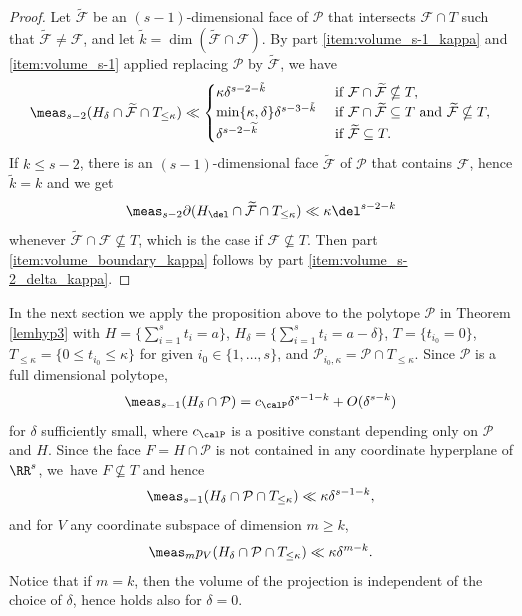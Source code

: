 \begin{proof}
Let $\widetilde{\mathcal F}$ be an $(s-1)$-dimensional face of $\mathcal P$ that intersects $\mathcal F\cap T$
such that $\widetilde{\mathcal F}\neq\mathcal F$, and let
$\tilde k=\dim(\widetilde{\mathcal F}\cap\mathcal F)$. By part \eqref{item:volume_s-1_kappa} and \eqref{item:volume_s-1} applied replacing
$\mathcal P$ by $\widetilde{\mathcal F}$, we have
\[
\meas_{s-2}(H_\delta\cap\widetilde{\mathcal F}\cap T_{\leq\kappa})
\ll \begin{cases}
\kappa\delta^{s-2-\tilde k} & \text{ if }\mathcal F\cap\widetilde{\mathcal F}\nsubseteq T,\\
\min\{\kappa,\delta\}\delta^{s-3-\tilde k} &\text{ if } \mathcal F\cap\widetilde{\mathcal F}\subseteq T \text{ and } \widetilde{\mathcal F}\nsubseteq T,\\
\delta^{s-2-\widetilde k} & \text{ if } \widetilde{\mathcal F}\subseteq T.
\end{cases}
\]
If $k\leq s-2$, there is an $(s-1)$-dimensional face $\widetilde{\mathcal F}$ of $\mathcal P$ that contains $\mathcal F$, hence $\tilde k=k$ and we get
\[
\meas_{s-2} \partial (H_{\del}\cap \widetilde{\mathcal F}\cap T_{\leq\kappa}) \ll \kappa \del^{s-2-k}
\]
whenever $\widetilde{\mathcal F}\cap\mathcal F\nsubseteq T$, which is the case if $\mathcal F\nsubseteq T$.
Then part \eqref{item:volume_boundary_kappa} follows by part \eqref{item:volume_s-2_delta_kappa}.
\end{proof}

In the next section we apply the proposition above to the polytope $\mathcal P$ in Theorem \ref{lemhyp3} with $H=\{\sum_{i=1}^s t_i=a\}$, $H_\delta=\{\sum_{i=1}^s t_i=a-\delta\}$, $T=\{t_{i_0}=0\}$, $T_{\leq\kappa}=\{0\leq t_{i_0}\leq\kappa\}$ for given $i_0\in\{1,\dots,s\}$, and $\mathcal P_{i_0,\kappa}=\mathcal P\cap T_{\leq\kappa}$. Since $\mathcal P$ is a full dimensional polytope,
\[
\meas_{s-1} (H_\delta \cap \mathcal P)=
c_\calP \delta^{s-1-k}+O(\delta^{s-k})
\]
for $\delta$ sufficiently small, where $c_\calP$ is a positive constant depending only on $\mathcal P$ and $H$.
Since the face $F=H\cap\mathcal P$ is not contained in any coordinate hyperplane of $\RR^s$, we~have $F\nsubseteq T$ and hence\vspace*{-3pt}
\[
\meas_{s-1} (H_\delta \cap \mathcal P \cap T_{\leq \kappa}) \ll
\kappa \delta^{s-1-k},
\]
and for $V$ any coordinate subspace of dimension $m\geq k$,\vspace*{-3pt}
\[
\meas_mp_V(H_\delta\cap\mathcal P\cap T_{\leq \kappa})\ll
\kappa \delta^{m-k}.
\]
Notice that if $m=k$, then the volume of the projection is independent of the choice of $\delta$, hence holds also for $\delta=0$.

